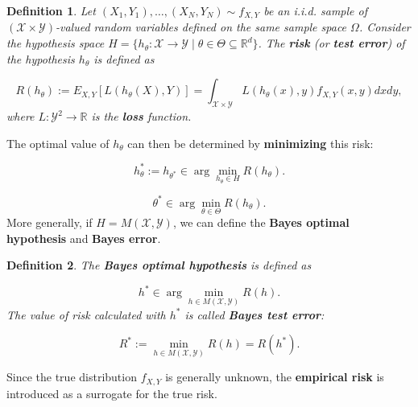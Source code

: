 \documentclass{report}
\newtheorem{definition}{Definition}[chapter]
\begin{document}
\begin{definition}
Let $(X_1, Y_1),\dots,(X_N, Y_N) \sim f_{X,Y}$ be an i.i.d. sample of $(\mathcal{X} \times \mathcal{Y})$-valued random variables defined on the same sample space $\Omega$. Consider the hypothesis space $H = \{h_\theta : \mathcal{X} \to \mathcal{Y} \mid\theta\in\Theta\subseteq\mathbb{R}^d\}$. The \textbf{risk} (or \textbf{test error}) of the hypothesis $h_\theta$ is defined as

\begin{equation}
R(h_\theta) := E_{X,Y}[L(h_\theta(X),Y)] = \int_{\mathcal{X} \times \mathcal{Y}} L(h_\theta(x),y)f_{X,Y}(x,y)dxdy,
\end{equation}
where $L :\mathcal{Y}^2 \to \mathbb{R}$ is the \textbf{loss} function.
\end{definition}
The optimal value of $h_\theta$ can then be determined by \textbf{minimizing} this risk:

\begin{equation}
h_\theta^* := h_{\theta^*} \in \arg \min_{h_\theta \in H} R(h_\theta).
\end{equation}

\begin{equation}
\theta^* \in \arg \min_{\theta \in \Theta} R(h_\theta).
\end{equation}
More generally, if $H = M(\mathcal{X}, \mathcal{Y})$, we can define the \textbf{Bayes optimal hypothesis} and \textbf{Bayes error}.

\begin{definition}
The \textbf{Bayes optimal hypothesis} is defined as

\begin{equation}
h^*\in \arg \min_{h \in M(\mathcal{X}, \mathcal{Y})} R(h).
\end{equation}
The value of risk calculated with $h^*$ is called \textbf{Bayes test error}:

\begin{equation}
R^* := \min_{h \in M(\mathcal{X}, \mathcal{Y})} R(h) = R(h^*).
\end{equation}
\end{definition}
Since the true distribution $f_{X,Y}$ is generally unknown, the \textbf{empirical risk} is introduced as a surrogate for the true risk.
\end{document}
